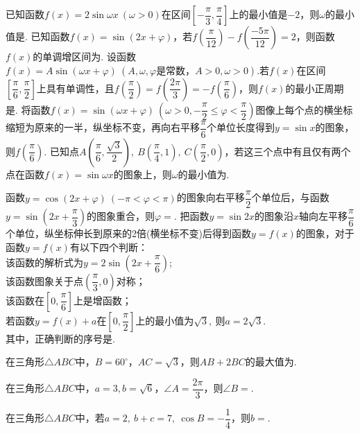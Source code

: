 \begin{questions}
\qs 已知函数$f(x)=2\sin \omega x\ (\omega>0)$在区间$ \left[-\dfrac{\pi}{3},\dfrac{\pi}{4}\right] $上的最小值是$ -2 $，则$ \omega $的最小值是\tk.
\qs 已知函数$f(x)=\sin (2x+\varphi)$，若$    f\left(\dfrac{\pi}{12}\right)-f\left(\dfrac{-5\pi}{12}\right)=2 $，则函数$f(x)$的单调增区间为\tk.
\qs 设函数$ f(x)=A\sin\left(\omega x+\varphi\right)\ \left(A,\omega,\varphi \text{是常数，}A>0,\omega>0\right)$.若$ f(x) $在区间$ \left[\dfrac{\pi}{6},\dfrac{\pi}{2}\right] $上具有单调性，且$f\left(\dfrac{\pi}{2}\right)=f\left(\dfrac{2\pi}{3}\right)=-f\left(\dfrac{\pi}{6}\right) $，则$ f(x) $的最小正周期是\tk.
\qs 将函数$f(x)=\sin (\omega x+\varphi)\ \left(\omega >0,-\dfrac{\pi}{2}\le \varphi<\dfrac{\pi}{2}\right)$图像上每个点的横坐标缩短为原来的一半，纵坐标不变，再向右平移$ \dfrac{\pi}{6} $个单位长度得到$ y=\sin x $的图象，则$ f\left(\dfrac{\pi}{6}\right) $\tk.
\qs 已知点$ A\left(\dfrac{\pi}{6},\dfrac{\sqrt{3}}{2}\right),\ B\left(\dfrac{\pi}{4},1\right),\ C\left(\dfrac{\pi}{2},0\right)$，若这三个点中有且仅有两个点在函数$f(x)=\sin \omega x$的图象上，则$ \omega $的最小值为\tk.

\qs 函数$y=\cos (2x+\varphi)\ (-\pi<\varphi<\pi)$的图象向右平移$\dfrac{\pi}{2}$个单位后，与函数$y=\sin (2x+\dfrac{\pi}{3})$的图象重合，则$\varphi=$\tk.
\qs 把函数$ y=\sin 2x $的图象沿$x$轴向左平移$ \dfrac{\pi}{6} $个单位，纵坐标伸长到原来的2倍(横坐标不变)后得到函数$ y=f(x) $的图象，对于函数$ y=f(x) $有以下四个判断：\\
 该函数的解析式为$ y=2\sin \left(2x+\dfrac{\pi}{6}\right) $;\\
 该函数图象关于点$ \left(\dfrac{\pi}{3},0\right) $对称；\\
 该函数在$ \left[0,\dfrac{\pi}{6}\right] $上是增函数；\\
 若函数$ y=f(x)+a $在$ \left[0,\dfrac{\pi}{2}\right] $上的最小值为$ \sqrt{3},\  $则$ a=2\sqrt{3} .$\\
其中，正确判断的序号是\tk.




\qs 在三角形$\triangle ABC$中，$ B=60^{\circ} $，$ AC=\sqrt{3} $，则$ AB+2BC $的最大值为\tk.


\qs 在三角形$\triangle ABC$中，$ a=3,b=\sqrt{6} $，$ \angle A=\dfrac{2\pi}{3} $，则$ \angle B= $\tk.

\qs 在三角形$\triangle ABC$中，若$ a=2,\ b+c=7,\ \cos B=-\dfrac{1}{4} $，则$ b= $\tk.


\end{questions}
